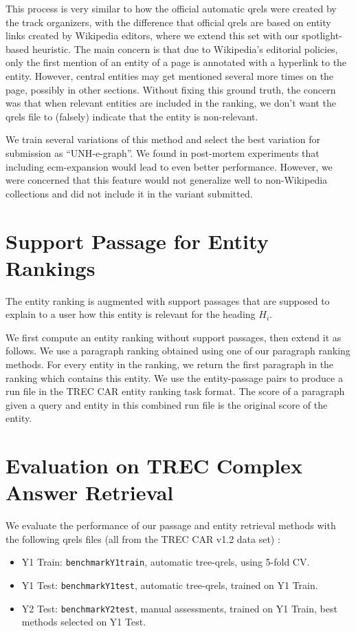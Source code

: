 \documentclass{article}
\begin{document}
This process is very similar to how the official automatic qrels were created by the track organizers, with the difference that official qrels are based on entity links created by Wikipedia editors, where we extend this set with our spotlight-based heuristic. The main concern is that due to Wikipedia's editorial policies, only the first mention of an entity of a page is annotated with a hyperlink to the entity. However, central entities may get mentioned several more times on the page, possibly in other sections. Without fixing this ground truth, the concern was that when relevant entities are included in the ranking, we don't want the qrels file to (falsely) indicate that the entity is non-relevant.

We train several variations of this method and select the best variation for submission as ``UNH-e-graph''. We found in post-mortem experiments that including ecm-expansion would lead to even better performance. However, we were concerned that this feature would not generalize well to non-Wikipedia collections and did not include it in the variant submitted.

\section{Support Passage for Entity Rankings}

The entity ranking is augmented with support passages that are supposed to explain to a user how this entity is relevant for the heading $H_i$.

We first compute an entity ranking without support passages, then extend it as follows. We use a paragraph ranking obtained using one of our paragraph ranking methods. For every entity in the ranking, we return the first paragraph in the ranking which contains this entity. We use the entity-passage pairs to produce a run file in the TREC CAR entity ranking task format. The score of a paragraph given a query and entity in this combined run file is the original score of the entity.


\section{Evaluation on TREC Complex Answer Retrieval}


We evaluate the performance of our passage and entity retrieval methods with the following qrels files (all from the TREC CAR v1.2 data set) \cite{trecdata21}:

\begin{itemize}
    \item Y1 Train: \texttt{benchmarkY1train}, automatic tree-qrels, using 5-fold CV.
    \item Y1 Test: \texttt{benchmarkY1test}, automatic tree-qrels, trained on Y1 Train.
    \item Y2 Test: \texttt{benchmarkY2test}, manual assessments, trained on Y1 Train, best methods selected on Y1 Test.
\end{itemize}
\end{document}
